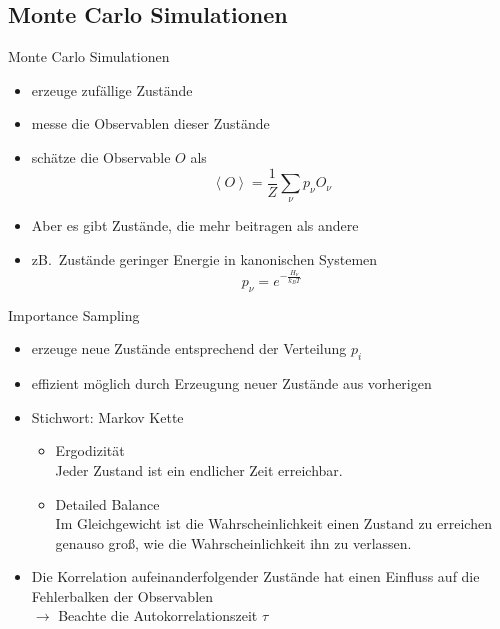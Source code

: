 \documentclass{beamer}
\newcommand{\avg}[1]{\left< #1 \right>}
\begin{document}
    \subsection{Monte Carlo Simulationen}
        \begin{frame}{Monte Carlo Simulationen}
            \begin{itemize}[<+->]
                \item erzeuge zufällige Zustände
                \item messe die Observablen dieser Zustände
                \item{ schätze die Observable \(O\) als
                    \begin{equation}
                        \avg{O} = \frac{1}{Z} \sum_\nu p_\nu O_\nu
                    \end{equation}
                }
            \end{itemize}
            \begin{itemize}[<+->]
                \item Aber es gibt Zustände, die mehr beitragen als andere
                \item{ zB.\ Zustände geringer Energie in kanonischen Systemen
                    \begin{equation}
                        p_{\nu} = e^{-\frac{H_{\nu}}{k_{B}T}}
                    \end{equation}
                }
            \end{itemize}
        \end{frame}

        \begin{frame}{Importance Sampling}
            \begin{itemize}[<+->]
                \item erzeuge neue Zustände entsprechend der Verteilung \(p_{i}\)
                \item effizient möglich durch Erzeugung neuer Zustände aus vorherigen
                \item{ Stichwort: Markov Kette
                    \begin{itemize}
                        \item Ergodizität\\
                                Jeder Zustand ist ein endlicher Zeit erreichbar.
                        \item Detailed Balance\\
                                Im Gleichgewicht ist die Wahrscheinlichkeit einen Zustand zu erreichen genauso groß, wie die Wahrscheinlichkeit ihn zu verlassen.
                    \end{itemize}
                }
                \item Die Korrelation aufeinanderfolgender Zustände hat einen Einfluss auf die Fehlerbalken der Observablen\\
                    \(\to\) Beachte die Autokorrelationszeit \(\tau\)
            \end{itemize}
        \end{frame}
\end{document}
